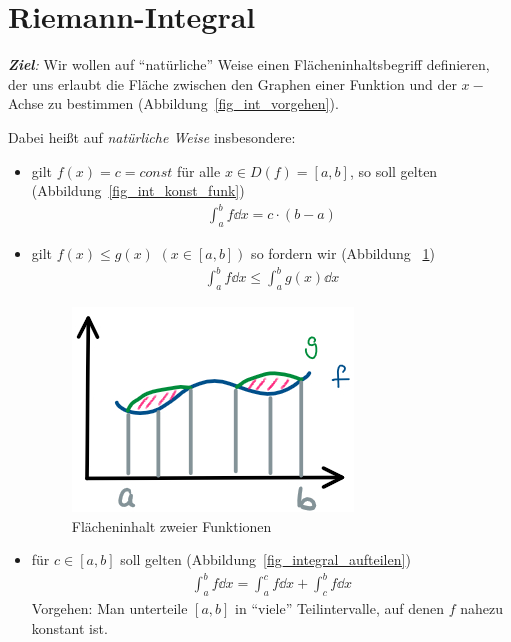 \section{Riemann-Integral}\label{kap_riemann_integral}
\emph{\textbf{Ziel}:} Wir wollen auf \enquote{natürliche} Weise einen 
Flächeninhaltsbegriff definieren, der uns erlaubt die Fläche zwischen den Graphen 
einer Funktion und der $x-$Achse zu bestimmen (Abbildung~\ref{fig_int_vorgehen}).
	
	
Dabei heißt auf \emph{natürliche Weise} insbesondere: 
\begin{itemize}
	\item gilt $f(x) = c = const$ für alle $x \in D (f) = [a,b]$, so soll 
	gelten (Abbildung~\ref{fig_int_konst_funk})
	\begin{align*}
		\int_a^b f \dd{x} = c \cdot ( b - a)
	\end{align*}
	
	
	\item gilt $f(x) \leq g(x)$ $(x \in [a,b])$ so fordern wir (Abbildung~
	\ref{plot_flaeche_zweier_fkt})
	\begin{align*}
		\int_a^b f \dd{x} \leq \int_a^b g(x) \dd{x} 
	\end{align*}
	\begin{figure}[ht]
		\begin{center}
			\includegraphics[scale=0.5]{Skizzen/plot_integral_zwei_fkt}
		\end{center}
		\caption{Flächeninhalt zweier Funktionen}
		\label{plot_flaeche_zweier_fkt}
	\end{figure}
	
	\item für $c \in [a,b]$ soll gelten (Abbildung~\ref{fig_integral_aufteilen})
	\begin{align*}
		\int_a^b f \dd{x} = \int_a^c f \dd{x} + \int_c^b f\dd{x}
	\end{align*}
	Vorgehen: Man unterteile $[a,b]$ in \enquote{viele} Teilintervalle, auf denen 
	$f$ nahezu konstant ist.
	
\end{itemize} 

